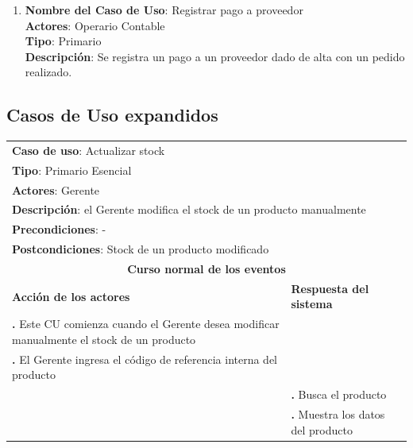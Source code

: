 \documentclass[12pt]{extarticle}
\begin{document}
\begin{spacing}{1.2}
\begin{enumerate}
        \item 	\textbf{Nombre del Caso de Uso}: Registrar pago a proveedor\\
                \textbf{Actores}: Operario Contable\\
                \textbf{Tipo}: Primario\\
                \textbf{Descripción}: Se registra un pago a un proveedor dado de alta con un pedido realizado.
    \end{enumerate}
    \clearpage














    

    \subsection{Casos de Uso expandidos}

    \newcommand\inc{\stepcounter{step}\textbf{\thestep. }}

    \newcommand\resetinc{\setcounter{step}{0}}

    \newcommand\raya{\noindent\rule{169mm}{0.8mm}\\}

    \newcommand\finCU{\resetinc{}\raya{}}


	\begin{longtable}{ |p{8cm}|p{8cm}| }
		\hline
		\multicolumn{2}{|p{16cm}|}{\textbf{Caso de uso}: Actualizar stock}\\
		\multicolumn{2}{|p{16cm}|}{\textbf{Tipo}: Primario Esencial}\\
		\multicolumn{2}{|p{16cm}|}{\textbf{Actores}: Gerente}\\
		\multicolumn{2}{|p{16cm}|}{\textbf{Descripción}: el Gerente modifica el stock de un producto manualmente}\\
		\multicolumn{2}{|p{16cm}|}{\textbf{Precondiciones}: -}\\
        \multicolumn{2}{|p{16cm}|}{\textbf{Postcondiciones}: Stock de un producto modificado}\\
		\hline
		\multicolumn{2}{|c|}{\textbf{Curso normal de los eventos}}\\
		\hline
		\textbf{Acción de los actores} & \textbf{Respuesta del sistema}\\
		\hline
			\inc Este CU comienza cuando el Gerente desea modificar manualmente el stock de un producto& \\
			\hline
			\inc  El Gerente ingresa el código de referencia interna del producto& \\
			\hline
		    & \inc Busca el producto \\
			\hline
			& \inc Muestra los datos del producto\\
			\hline



\end{longtable}
\end{spacing}
\end{document}
